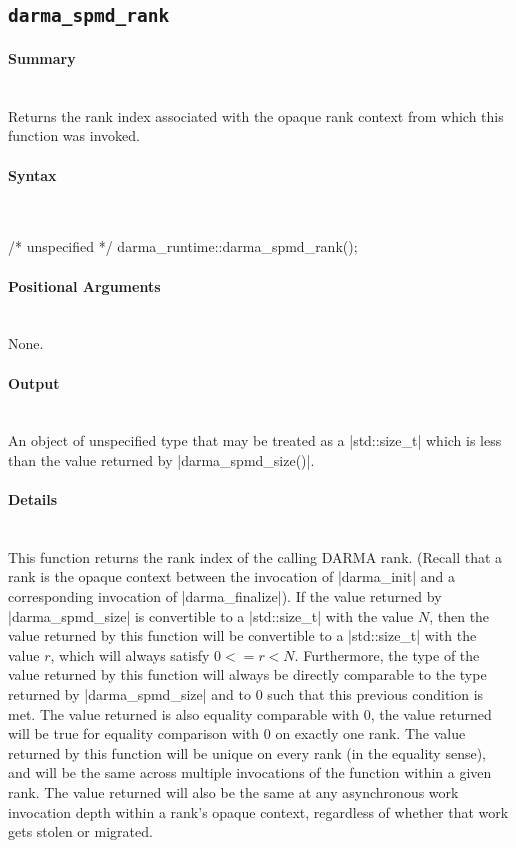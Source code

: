 


\subsection{\texttt{darma\_spmd\_rank}}

\paragraph{Summary}\mbox{}\\
Returns the rank index associated with the opaque rank context from which this
function was invoked.

\paragraph{Syntax}\mbox{}\\
\begin{CppCode}
/* unspecified */ darma_runtime::darma_spmd_rank();
\end{CppCode}

\paragraph{Positional Arguments} \mbox{}\\
None. 

\paragraph{Output}\mbox{}\\
An object of unspecified type that may be treated as a |std::size_t|
which is less than the value returned by |darma_spmd_size()|.

\paragraph{Details}\mbox{}\\
This function returns the rank index of the calling DARMA rank.  (Recall that a
rank is the opaque context between the invocation of |darma_init| and
a corresponding invocation of |darma_finalize|).  If the value returned
by |darma_spmd_size| is convertible to a |std::size_t| with the
value $N$, then the value returned by this function will be convertible to a
|std::size_t| with the value $r$, which will always satisfy $0 <=
r < N$.  Furthermore, the type of the value returned by this function will
always be directly comparable to the type returned by |darma_spmd_size|
and to $0$ such that this previous condition is met.  The value returned is also
equality comparable with $0$, the value returned will be true for equality
comparison with $0$ on exactly one rank.  The value returned by this function
will be unique on every rank (in the equality sense), and will be the same
across multiple invocations of the function within a given rank.  The value
returned will also be the same at any asynchronous work invocation depth within
a rank's opaque context, regardless of whether that work gets stolen or
migrated.

